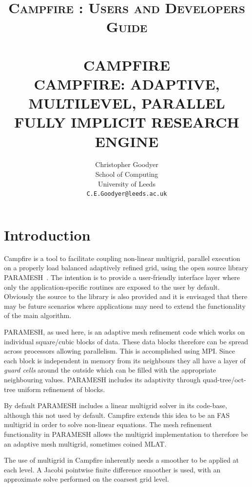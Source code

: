 \documentclass[paper=a4, fontsize=11pt,twoside,bibtotoc]{scrartcl}		%
\title{	\normalsize \textsc{Campfire : Users and Developers Guide} 	%
		 	\\[1.0cm]									%
			\HRule{2pt} \\										%
			\Huge \textbf{\uppercase{CAMPFIRE}}\\	%
			\Large \textbf{\uppercase{Campfire: Adaptive, Multilevel, Parallel\\ Fully Implicit Research Engine }}	%
			\HRule{2pt} \\ [0.5cm]								%
			\normalsize %
		}
\author{
		Christopher Goodyer\\	
		School of Computing\\	
		University of Leeds\\
        \texttt{C.E.Goodyer@leeds.ac.uk} \\
}
\makeatletter
\def\printtitle{%
    {\centering \@title\par}}
\def\printauthor{%
    {\centering \large \@author}}
\newcommand{\CiteParamesh}{\cite{paramesh1,paramesh2, paramesh3}}
\makeatother
\begin{document}
\thispagestyle{empty}				%

\printtitle									%
  	\vfill
\printauthor								%
  	\vfill

\newpage

\tableofcontents

\clearpage

\section{Introduction}

Campfire is a tool to facilitate coupling non-linear multigrid, parallel execution on a properly load balanced adaptively refined grid, using the open source 
library PARAMESH~\CiteParamesh.  
The intention is to provide a user-friendly interface layer where only the application-specific routines are exposed to the user by default.
Obviously the source to the library is also provided and it is envisaged that there may be future scenarios where applications may need to extend the functionality 
of the main algorithm.

PARAMESH, as used here, is an adaptive mesh refinement code which works on individual square/cubic blocks of data.  These data blocks therefore can be spread 
across processors allowing parallelism.  This is accomplished using MPI.  Since each block is independent in memory from its neighbours they all have a layer of 
\textsl{guard cells} around the outside which can be filled with the appropriate neighbouring values.  PARAMESH includes its adaptivity through quad-tree/oct-tree
uniform refinement of blocks.

By default PARAMESH includes a linear multigrid solver in its code-base, although this not used by default.
Campfire extends this idea to be an FAS multigrid in order to solve non-linear equations.
The mesh refinement functionality in PARAMESH allows the multigrid implementation to therefore be an adaptive mesh multigrid, sometimes coined MLAT.

The use of multigrid in Campfire inherently needs a smoother to be applied at each level.  A Jacobi pointwise finite difference smoother is used, with an 
approximate solve performed on the coarsest grid level.
\end{document}
